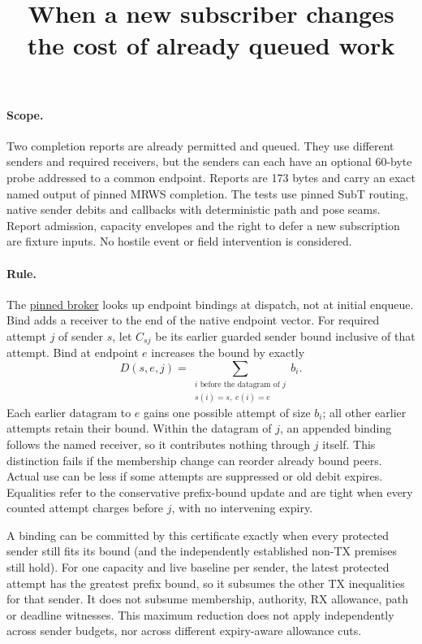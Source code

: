 \documentclass[11pt]{article}
\title{When a new subscriber changes the cost of already queued work}
\author{}\date{}
\begin{document}
\maketitle

\paragraph{Scope.}
Two completion reports are already permitted and queued. They use
different senders and required receivers, but the senders can each have
an optional 60-byte probe addressed to a common endpoint. Reports are
173 bytes and carry an exact named output of pinned MRWS completion.
The tests use pinned SubT routing, native sender debits and callbacks
with deterministic path and pose seams. Report admission, capacity
envelopes and the right to defer a new subscription are fixture inputs.
No hostile event or field intervention is considered.

\paragraph{Rule.}
The \href{https://github.com/osrf/subt/blob/083c6a8acb0c25aa1a35e34517e628cd3b52ae77/subt-communication/subt_communication_broker/src/subt_communication_broker.cpp}{pinned broker}
looks up endpoint bindings at dispatch, not at initial enqueue. Bind
adds a receiver to the end of the native endpoint vector. For required
attempt \(j\) of sender \(s\), let \(C_{sj}\) be its earlier guarded
sender bound inclusive of that attempt. Bind at endpoint \(e\) increases
the bound by exactly
\[
 D(s,e,j)=\sum_{\substack{i\text{ before the datagram of }j\\
               s(i)=s,\;e(i)=e}} b_i .
\]
Each earlier datagram to \(e\) gains one possible attempt of size \(b_i\);
all other earlier attempts retain their bound. Within the datagram of
\(j\), an appended binding follows the named receiver, so it contributes
nothing through \(j\) itself. This distinction fails if the membership
change can reorder already bound peers. Actual use can be less if some
attempts are suppressed or old debit expires. Equalities refer to
the conservative prefix-bound update and are tight when every counted
attempt charges before \(j\), with no intervening expiry.

A binding can be committed by this certificate exactly when every
protected sender still fits its bound (and the independently established
non-TX premises still hold). For one capacity and live baseline per
sender, the latest protected attempt has the greatest prefix bound,
so it subsumes the other TX inequalities for that sender. It does not
subsume membership, authority, RX allowance, path or deadline witnesses.
This maximum reduction does not apply independently across sender
budgets, nor across different expiry-aware allowance cuts.
\end{document}
